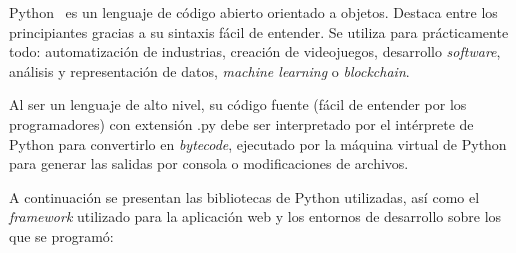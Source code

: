Python~\cite{python} es un lenguaje de código abierto orientado a objetos. Destaca entre los principiantes gracias a su sintaxis fácil de entender. Se utiliza para prácticamente todo: automatización de industrias, creación de videojuegos, desarrollo \textit{software}, análisis y representación de datos, \textit{machine learning} o \textit{blockchain}.

Al ser un lenguaje de alto nivel, su código fuente (fácil de entender por los programadores) con extensión .py debe ser interpretado por el intérprete de Python para convertirlo en \textit{bytecode}, ejecutado por la máquina virtual de Python para generar las salidas por consola o modificaciones de archivos.

A continuación se presentan las bibliotecas de Python utilizadas, así como el \textit{framework} utilizado para la aplicación web y los entornos de desarrollo sobre los que se programó:


